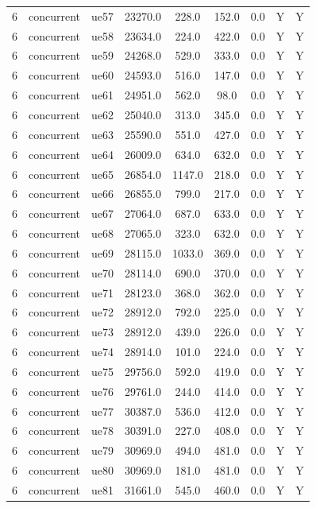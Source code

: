 \begin{table}[ht]
\begin{tabular}{|c|c|c|c|c|c|c|c|c|}
6 & concurrent & ue57 & 23270.0 & 228.0 & 152.0 & 0.0 & Y & Y \\
6 & concurrent & ue58 & 23634.0 & 224.0 & 422.0 & 0.0 & Y & Y \\
6 & concurrent & ue59 & 24268.0 & 529.0 & 333.0 & 0.0 & Y & Y \\
6 & concurrent & ue60 & 24593.0 & 516.0 & 147.0 & 0.0 & Y & Y \\
6 & concurrent & ue61 & 24951.0 & 562.0 & 98.0 & 0.0 & Y & Y \\
6 & concurrent & ue62 & 25040.0 & 313.0 & 345.0 & 0.0 & Y & Y \\
6 & concurrent & ue63 & 25590.0 & 551.0 & 427.0 & 0.0 & Y & Y \\
6 & concurrent & ue64 & 26009.0 & 634.0 & 632.0 & 0.0 & Y & Y \\
6 & concurrent & ue65 & 26854.0 & 1147.0 & 218.0 & 0.0 & Y & Y \\
6 & concurrent & ue66 & 26855.0 & 799.0 & 217.0 & 0.0 & Y & Y \\
6 & concurrent & ue67 & 27064.0 & 687.0 & 633.0 & 0.0 & Y & Y \\
6 & concurrent & ue68 & 27065.0 & 323.0 & 632.0 & 0.0 & Y & Y \\
6 & concurrent & ue69 & 28115.0 & 1033.0 & 369.0 & 0.0 & Y & Y \\
6 & concurrent & ue70 & 28114.0 & 690.0 & 370.0 & 0.0 & Y & Y \\
6 & concurrent & ue71 & 28123.0 & 368.0 & 362.0 & 0.0 & Y & Y \\
6 & concurrent & ue72 & 28912.0 & 792.0 & 225.0 & 0.0 & Y & Y \\
6 & concurrent & ue73 & 28912.0 & 439.0 & 226.0 & 0.0 & Y & Y \\
6 & concurrent & ue74 & 28914.0 & 101.0 & 224.0 & 0.0 & Y & Y \\
6 & concurrent & ue75 & 29756.0 & 592.0 & 419.0 & 0.0 & Y & Y \\
6 & concurrent & ue76 & 29761.0 & 244.0 & 414.0 & 0.0 & Y & Y \\
6 & concurrent & ue77 & 30387.0 & 536.0 & 412.0 & 0.0 & Y & Y \\
6 & concurrent & ue78 & 30391.0 & 227.0 & 408.0 & 0.0 & Y & Y \\
6 & concurrent & ue79 & 30969.0 & 494.0 & 481.0 & 0.0 & Y & Y \\
6 & concurrent & ue80 & 30969.0 & 181.0 & 481.0 & 0.0 & Y & Y \\
6 & concurrent & ue81 & 31661.0 & 545.0 & 460.0 & 0.0 & Y & Y \\

\end{tabular}
\end{table}

